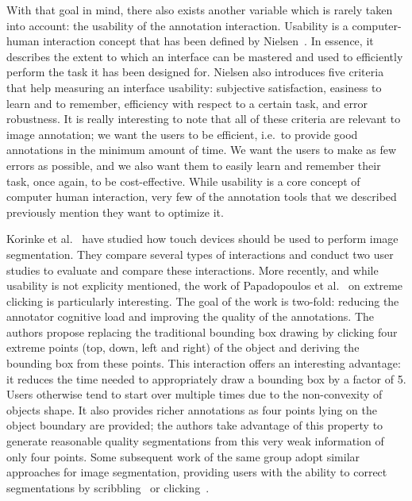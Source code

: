 With that goal in mind, there also exists another variable
which is rarely taken into account: the usability of the annotation interaction.
Usability is a computer-human interaction concept
that has been defined by Nielsen~\cite{nielsen1994usability}.
In essence, it describes the extent to which an interface
can be mastered and used to efficiently perform the task it has been designed for.
Nielsen also introduces five criteria that help measuring an interface usability:
subjective satisfaction, easiness to learn and to remember,
efficiency with respect to a certain task, and error robustness.
It is really interesting to note that all of these criteria
are relevant to image annotation;
we want the users to be efficient, i.e.\ to provide good annotations
in the minimum amount of time.
We want the users to make as few errors as possible,
and we also want them to easily learn and remember their task, once again, to be cost-effective.
While usability is a core concept of computer human interaction,
very few of the annotation tools that we described previously mention they want to optimize it.


Korinke et al.~\cite{korinke_intuitive_2015,korinke_exploring_2015}
have studied how touch devices should be used to perform image segmentation.
They compare several types of interactions and conduct
two user studies to evaluate and compare these interactions.
More recently, and while usability is not explicity mentioned,
the work of Papadopoulos et al.~\cite{papadopoulos2017extreme}
on extreme clicking is particularly interesting.
The goal of the work is two-fold: reducing the annotator cognitive load
and improving the quality of the annotations.
The authors propose replacing the traditional bounding box drawing
by clicking four extreme points (top, down, left and right)
of the object and deriving the bounding box from these points.
This interaction offers an interesting advantage:
it reduces the time needed to appropriately draw a bounding box by a factor of 5.
Users otherwise tend to start over multiple times due to the non-convexity of objects shape.
It also provides richer annotations as four points lying on the object boundary are provided;
the authors take advantage of this property to generate reasonable quality segmentations
from this very weak information of only four points.
Some subsequent work of the same group adopt similar approaches for image segmentation,
providing users with the ability to correct segmentations
by scribbling~\cite{agustsson2018interactive} or clicking~\cite{OpenImagesSegmentation}.



